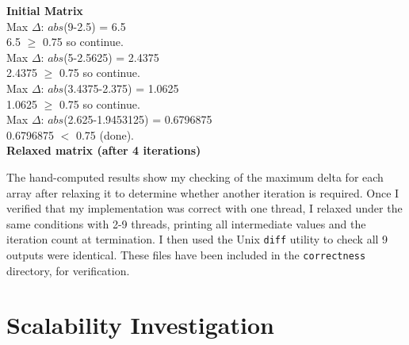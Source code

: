 \documentclass[12pt]{article}
\begin{document}
\begin{minipage}{.5\textwidth}
\vspace{0.6cm}
	\textbf{Initial Matrix}\\[1.9cm]
	Max $\Delta$: $abs$(9-2.5) = 6.5\\
	6.5 $\geq$ 0.75 so continue.\\[1.6cm]
	
	Max $\Delta$: $abs$(5-2.5625) = 2.4375\\
	2.4375 $\geq$ 0.75 so continue.\\[1.6cm]
	
	Max $\Delta$: $abs$(3.4375-2.375) = 1.0625\\
	1.0625 $\geq$ 0.75 so continue.\\[1.6cm]
	
	Max $\Delta$: $abs$(2.625-1.9453125) = 0.6796875\\
	0.6796875 $<$ 0.75 (done).\\[1.9cm]
	\textbf{Relaxed matrix (after 4 iterations)}
\end{minipage}

The hand-computed results show my checking of the maximum delta for each array after relaxing it to determine whether another iteration is required. Once I verified that my implementation was correct with one thread, I relaxed under the same conditions with 2-9 threads, printing all intermediate values and the iteration count at termination. I then used the Unix \texttt{diff} utility to check all 9 outputs were identical. These files have been included in the \texttt{correctness} directory, for verification.

\section{Scalability Investigation}
\end{document}

